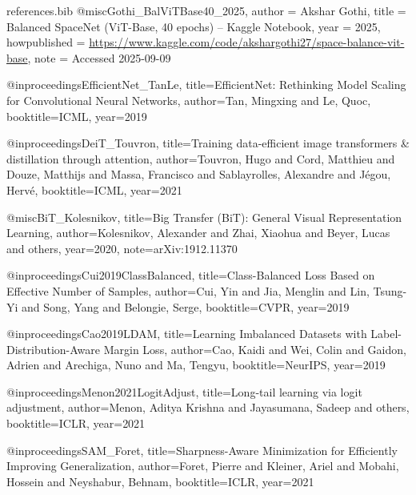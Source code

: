 \begin{filecontents*}{references.bib}
@misc{Gothi_BalViTBase40_2025,
  author       = {Akshar Gothi},
  title        = {Balanced SpaceNet (ViT-Base, 40 epochs) -- Kaggle Notebook},
  year         = {2025},
  howpublished = {\url{https://www.kaggle.com/code/akshargothi27/space-balance-vit-base}},
  note         = {Accessed 2025-09-09}
}

@inproceedings{EfficientNet_TanLe,
  title={EfficientNet: Rethinking Model Scaling for Convolutional Neural Networks},
  author={Tan, Mingxing and Le, Quoc},
  booktitle={ICML},
  year={2019}
}

@inproceedings{DeiT_Touvron,
  title={Training data-efficient image transformers \& distillation through attention},
  author={Touvron, Hugo and Cord, Matthieu and Douze, Matthijs and Massa, Francisco and Sablayrolles, Alexandre and J{\'e}gou, Herv{\'e}},
  booktitle={ICML},
  year={2021}
}

@misc{BiT_Kolesnikov,
  title={Big Transfer (BiT): General Visual Representation Learning},
  author={Kolesnikov, Alexander and Zhai, Xiaohua and Beyer, Lucas and others},
  year={2020},
  note={arXiv:1912.11370}
}

@inproceedings{Cui2019ClassBalanced,
  title={Class-Balanced Loss Based on Effective Number of Samples},
  author={Cui, Yin and Jia, Menglin and Lin, Tsung-Yi and Song, Yang and Belongie, Serge},
  booktitle={CVPR},
  year={2019}
}

@inproceedings{Cao2019LDAM,
  title={Learning Imbalanced Datasets with Label-Distribution-Aware Margin Loss},
  author={Cao, Kaidi and Wei, Colin and Gaidon, Adrien and Arechiga, Nuno and Ma, Tengyu},
  booktitle={NeurIPS},
  year={2019}
}

@inproceedings{Menon2021LogitAdjust,
  title={Long-tail learning via logit adjustment},
  author={Menon, Aditya Krishna and Jayasumana, Sadeep and others},
  booktitle={ICLR},
  year={2021}
}

@inproceedings{SAM_Foret,
  title={Sharpness-Aware Minimization for Efficiently Improving Generalization},
  author={Foret, Pierre and Kleiner, Ariel and Mobahi, Hossein and Neyshabur, Behnam},
  booktitle={ICLR},
  year={2021}
}
\end{filecontents*}


\documentclass[conference]{IEEEtran}
\IEEEoverridecommandlockouts

\usepackage{graphicx}
\usepackage{booktabs}
\usepackage{multirow}
\usepackage{amsmath, amssymb}
\usepackage{siunitx}
\usepackage{xcolor}
\usepackage{url}
\usepackage{float}
\usepackage{placeins}
\usepackage{cite}
\usepackage{hyperref}

